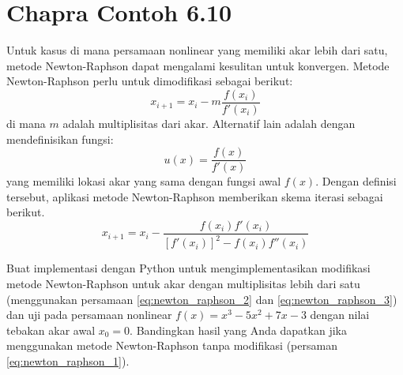 \section{Chapra Contoh 6.10}
Untuk kasus di mana persamaan nonlinear yang memiliki akar
lebih dari satu, metode Newton-Raphson dapat mengalami kesulitan
untuk konvergen. Metode Newton-Raphson perlu untuk dimodifikasi
sebagai berikut:
\begin{equation}
x_{i+1} = x_{i} - m\frac{f(x_{i})}{f'(x_{i})}
\label{eq:newton_raphson_2}
\end{equation}
di mana $m$ adalah multiplisitas dari akar.
Alternatif lain adalah dengan mendefinisikan fungsi:
\begin{equation*}
u(x) = \frac{f(x)}{f'(x)}
\end{equation*}
yang memiliki lokasi akar yang sama dengan fungsi awal $f(x)$.
Dengan definisi tersebut, aplikasi metode Newton-Raphson memberikan skema
iterasi sebagai berikut.
\begin{equation}
x_{i+1} = x_{i} - \frac{f(x_{i}) f'(x_{i})}{[f'(x_{i})]^{2} - f(x_{i})f''(x_{i})}
\label{eq:newton_raphson_3}
\end{equation}

\begin{soal}
Buat implementasi dengan Python untuk mengimplementasikan modifikasi metode
Newton-Raphson untuk akar dengan multiplisitas lebih dari satu
(menggunakan persamaan \eqref{eq:newton_raphson_2} dan \eqref{eq:newton_raphson_3})
dan uji pada persamaan nonlinear $f(x) = x^3 - 5x^2 + 7x - 3$ dengan nilai tebakan akar
awal $x_{0} = 0$. Bandingkan hasil yang Anda dapatkan jika menggunakan metode
Newton-Raphson tanpa modifikasi (persaman \eqref{eq:newton_raphson_1}).
\end{soal}